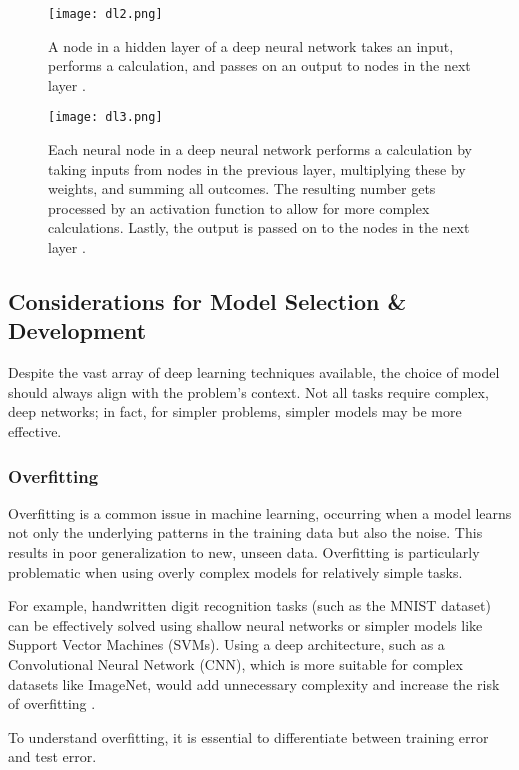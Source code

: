 \begin{figure}[H]
    \centering
    \texttt{[image: dl2.png]}
    \caption{A node in a hidden layer of a deep neural network takes an input, performs a calculation, and passes on an output to nodes in the next layer \cite{quantib_deep_learning_radiology}.}
    \label{fig:dl2}
\end{figure}

\begin{figure}[H]
    \centering
    \texttt{[image: dl3.png]}
    \caption{Each neural node in a deep neural network performs a calculation by taking inputs from nodes in the previous layer, multiplying these by weights, and summing all outcomes. The resulting number gets processed by an activation function to allow for more complex calculations. Lastly, the output is passed on to the nodes in the next layer \cite{quantib_deep_learning_radiology}.}
    \label{fig:dl3}
\end{figure}


\subsection{Considerations for Model Selection \& Development}
Despite the vast array of deep learning techniques available, the choice of model should always align with the problem's context. Not all tasks require complex, deep networks; in fact, for simpler problems, simpler models may be more effective.

\subsubsection{Overfitting}
Overfitting is a common issue in machine learning, occurring when a model learns not only the underlying patterns in the training data but also the noise. This results in poor generalization to new, unseen data. Overfitting is particularly problematic when using overly complex models for relatively simple tasks. 

For example, handwritten digit recognition tasks (such as the MNIST dataset) can be effectively solved using shallow neural networks or simpler models like Support Vector Machines (SVMs). Using a deep architecture, such as a Convolutional Neural Network (CNN), which is more suitable for complex datasets like ImageNet, would add unnecessary complexity and increase the risk of overfitting \cite{hastie2009elements, he2016deep}.


To understand overfitting, it is essential to differentiate between training error and test error. 

